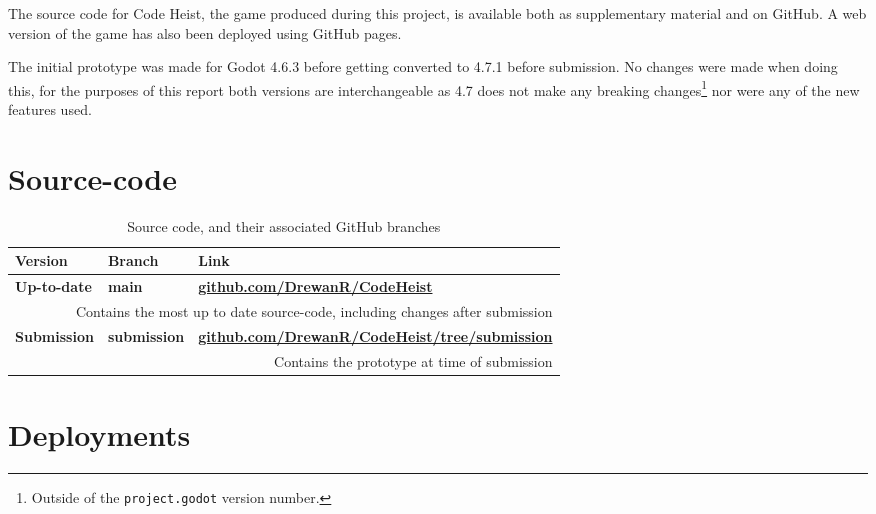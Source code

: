

The source code for Code Heist, the game produced during this project, is available both as supplementary material and on GitHub. A web version of the game has also been deployed using GitHub pages.

The initial prototype was made for Godot 4.6.3 before getting converted to 4.7.1 before submission. No changes were made when doing this, for the purposes of this report both versions are interchangeable as 4.7 does not make any breaking changes\footnote{Outside of the \texttt{project.godot} version number.} nor were any of the new features used.

\section{Source-code}\label{sec:source_code}

\begin{table}[H]
    \begin{tabularx}{1.0\textwidth} { 
       ll>{\raggedleft\arraybackslash}X  }
         Version &  Branch& Link\\\toprule
         \textbf{Up-to-date} & \textbf{main}& \textbf{\href{https://github.com/DrewanR/CodeHeist}{github.com/DrewanR/CodeHeist}}\\
         \multicolumn{3}{r}{Contains the most up to date source-code, including changes after submission}\\
         \textbf{Submission}&  \textbf{submission}& \textbf{\href{https://github.com/DrewanR/CodeHeist/tree/submission}{github.com/DrewanR/CodeHeist/tree/submission}}\\
         \multicolumn{3}{r}{Contains the prototype at time of submission}\\
         \bottomrule
    \end{tabularx}
    \caption{Source code, and their associated GitHub branches}
    \label{tab:source_repo_table}
\end{table}

\section{Deployments}\label{sec:deployments}

